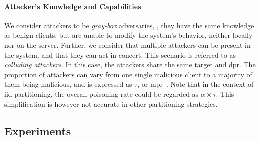 \paragraph{Attacker's Knowledge and Capabilities}

We consider attackers to be \emph{gray-box} adversaries, \ie, they have the same knowledge as benign clients, but are unable to modify the system's behavior, neither locally nor on the server.  
Further, we consider that multiple attackers can be present in the system, and that they can act in concert. 
This scenario is referred to as \emph{colluding attackers}.
In this case, the attackers share the same target and \gls{dpr}.
The proportion of attackers can vary from one single malicious client to a majority of them being malicious, and is expressed as $\tau$, or \gls{mpr}~\cite{merzouk_Parameterizingpoisoningattacks_2023}.
Note that in the context of \gls{iid} partitioning, the overall poisoning rate could be regarded as $\alpha \times \tau$.
This simplification is however not accurate in other partitioning strategies.


\subsection{Experiments\label{sec:assess.method.exps}}

